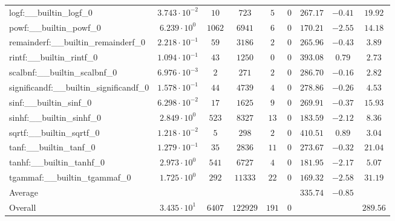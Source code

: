 \begin{tabular}{|l|c|c|c|c|c|c|c|c|}
logf:\_\_builtin\_logf\_0                 & $ 3.743 \cdot 10^{-2} $ & $ 10     $ & $ 723    $ & $ 5   $ & $ 0   $ & $ 267.17      $ & $ -0.41   $ & $ 19.92   $ \\
powf:\_\_builtin\_powf\_0                 & $ 6.239 \cdot 10^{0}  $ & $ 1062   $ & $ 6941   $ & $ 6   $ & $ 0   $ & $ 170.21      $ & $ -2.55   $ & $ 14.18   $ \\
remainderf:\_\_builtin\_remainderf\_0     & $ 2.218 \cdot 10^{-1} $ & $ 59     $ & $ 3186   $ & $ 2   $ & $ 0   $ & $ 265.96      $ & $ -0.43   $ & $ 3.89    $ \\
rintf:\_\_builtin\_rintf\_0               & $ 1.094 \cdot 10^{-1} $ & $ 43     $ & $ 1250   $ & $ 0   $ & $ 0   $ & $ 393.08      $ & $ 0.79    $ & $ 2.73    $ \\
scalbnf:\_\_builtin\_scalbnf\_0           & $ 6.976 \cdot 10^{-3} $ & $ 2      $ & $ 271    $ & $ 2   $ & $ 0   $ & $ 286.70      $ & $ -0.16   $ & $ 2.82    $ \\
significandf:\_\_builtin\_significandf\_0 & $ 1.578 \cdot 10^{-1} $ & $ 44     $ & $ 4739   $ & $ 4   $ & $ 0   $ & $ 278.86      $ & $ -0.26   $ & $ 4.53    $ \\
sinf:\_\_builtin\_sinf\_0                 & $ 6.298 \cdot 10^{-2} $ & $ 17     $ & $ 1625   $ & $ 9   $ & $ 0   $ & $ 269.91      $ & $ -0.37   $ & $ 15.93   $ \\
sinhf:\_\_builtin\_sinhf\_0               & $ 2.849 \cdot 10^{0}  $ & $ 523    $ & $ 8327   $ & $ 13  $ & $ 0   $ & $ 183.59      $ & $ -2.12   $ & $ 8.36    $ \\
sqrtf:\_\_builtin\_sqrtf\_0               & $ 1.218 \cdot 10^{-2} $ & $ 5      $ & $ 298    $ & $ 2   $ & $ 0   $ & $ 410.51      $ & $ 0.89    $ & $ 3.04    $ \\
tanf:\_\_builtin\_tanf\_0                 & $ 1.279 \cdot 10^{-1} $ & $ 35     $ & $ 2836   $ & $ 11  $ & $ 0   $ & $ 273.67      $ & $ -0.32   $ & $ 21.04   $ \\
tanhf:\_\_builtin\_tanhf\_0               & $ 2.973 \cdot 10^{0}  $ & $ 541    $ & $ 6727   $ & $ 4   $ & $ 0   $ & $ 181.95      $ & $ -2.17   $ & $ 5.07    $ \\
tgammaf:\_\_builtin\_tgammaf\_0           & $ 1.725 \cdot 10^{0}  $ & $ 292    $ & $ 11333  $ & $ 22  $ & $ 0   $ & $ 169.32      $ & $ -2.58   $ & $ 31.19   $ \\
\hline
Average                                   & $                     $ & $        $ & $        $ & $     $ & $     $ & $ 335.74      $ & $ -0.85   $ & $         $ \\
\hline
Overall                                   & $ 3.435 \cdot 10^{1}  $ & $ 6407   $ & $ 122929 $ & $ 191 $ & $ 0   $ & $             $ & $         $ & $ 289.56  $ \\
\hline
\end{tabular}

